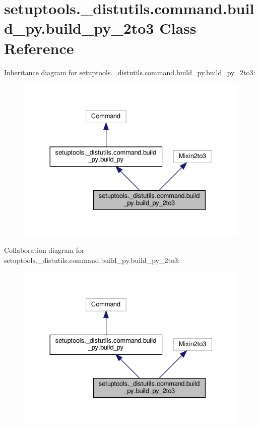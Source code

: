 \hypertarget{classsetuptools_1_1__distutils_1_1command_1_1build__py_1_1build__py__2to3}{}\section{setuptools.\+\_\+distutils.\+command.\+build\+\_\+py.\+build\+\_\+py\+\_\+2to3 Class Reference}
\label{classsetuptools_1_1__distutils_1_1command_1_1build__py_1_1build__py__2to3}


Inheritance diagram for setuptools.\+\_\+distutils.\+command.\+build\+\_\+py.\+build\+\_\+py\+\_\+2to3\+:
\nopagebreak
\begin{figure}[H]
\begin{center}
\leavevmode
\includegraphics[width=330pt]{classsetuptools_1_1__distutils_1_1command_1_1build__py_1_1build__py__2to3__inherit__graph}
\end{center}
\end{figure}


Collaboration diagram for setuptools.\+\_\+distutils.\+command.\+build\+\_\+py.\+build\+\_\+py\+\_\+2to3\+:
\nopagebreak
\begin{figure}[H]
\begin{center}
\leavevmode
\includegraphics[width=330pt]{classsetuptools_1_1__distutils_1_1command_1_1build__py_1_1build__py__2to3__coll__graph}
\end{center}
\end{figure}
